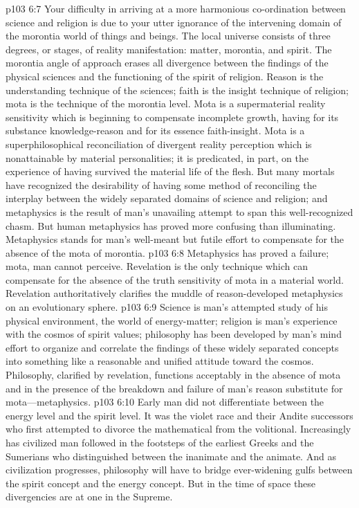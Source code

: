 \vs p103 6:7 Your difficulty in arriving at a more harmonious co\hyp{}ordination between science and religion is due to your utter ignorance of the intervening domain of the morontia world of things and beings. The local universe consists of three degrees, or stages, of reality manifestation: matter, morontia, and spirit. The morontia angle of approach erases all divergence between the findings of the physical sciences and the functioning of the spirit of religion. Reason is the understanding technique of the sciences; faith is the insight technique of religion; mota is the technique of the morontia level. Mota is a supermaterial reality sensitivity which is beginning to compensate incomplete growth, having for its substance knowledge\hyp{}reason and for its essence faith\hyp{}insight. Mota is a superphilosophical reconciliation of divergent reality perception which is nonattainable by material personalities; it is predicated, in part, on the experience of having survived the material life of the flesh. But many mortals have recognized the desirability of having some method of reconciling the interplay between the widely separated domains of science and religion; and metaphysics is the result of man’s unavailing attempt to span this well\hyp{}recognized chasm. But human metaphysics has proved more confusing than illuminating. Metaphysics stands for man’s well\hyp{}meant but futile effort to compensate for the absence of the mota of morontia.
\pc \vs p103 6:8 Metaphysics has proved a failure; mota, man cannot perceive. Revelation is the only technique which can compensate for the absence of the truth sensitivity of mota in a material world. Revelation authoritatively clarifies the muddle of reason\hyp{}developed metaphysics on an evolutionary sphere.
\vs p103 6:9 Science is man’s attempted study of his physical environment, the world of energy\hyp{}matter; religion is man’s experience with the cosmos of spirit values; philosophy has been developed by man’s mind effort to organize and correlate the findings of these widely separated concepts into something like a reasonable and unified attitude toward the cosmos. Philosophy, clarified by revelation, functions acceptably in the absence of mota and in the presence of the breakdown and failure of man’s reason substitute for mota---metaphysics.
\pc \vs p103 6:10 Early man did not differentiate between the energy level and the spirit level. It was the violet race and their Andite successors who first attempted to divorce the mathematical from the volitional. Increasingly has civilized man followed in the footsteps of the earliest Greeks and the Sumerians who distinguished between the inanimate and the animate. And as civilization progresses, philosophy will have to bridge ever\hyp{}widening gulfs between the spirit concept and the energy concept. But in the time of space these divergencies are at one in the Supreme.\plusone
